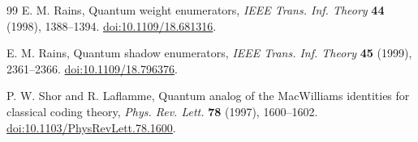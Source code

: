 \documentclass[11pt]{article}
\theoremstyle{definition}
\theoremstyle{remark}
\begin{document}
\begin{thebibliography}{99}
E. M. Rains, Quantum weight enumerators,
\emph{IEEE Trans. Inf. Theory} \textbf{44} (1998), 1388--1394.
\href{https://doi.org/10.1109/18.681316}{doi:10.1109/18.681316}.

E. M. Rains, Quantum shadow enumerators,
\emph{IEEE Trans. Inf. Theory} \textbf{45} (1999), 2361--2366.
\href{https://doi.org/10.1109/18.796376}{doi:10.1109/18.796376}.

P. W. Shor and R. Laflamme,
Quantum analog of the MacWilliams identities for classical coding theory,
\emph{Phys. Rev. Lett.} \textbf{78} (1997), 1600--1602.
\href{https://doi.org/10.1103/PhysRevLett.78.1600}{doi:10.1103/PhysRevLett.78.1600}.

\end{thebibliography}
\end{document}
